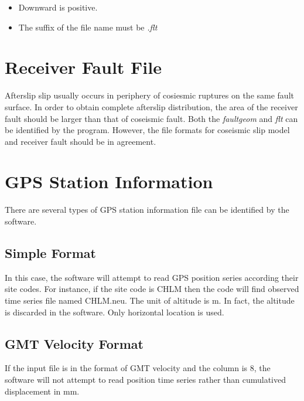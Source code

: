 \documentclass[UTF8,a4paper]{report}
\begin{document}
\begin{itemize}
\item Downward is positive.
\item The suffix of the file name must be \emph{.flt} 
\end{itemize}

\section{Receiver Fault File}
Afterslip slip usually occurs in periphery of cosiesmic ruptures on the same fault surface. In order to obtain complete afterslip distribution, the area of the receiver fault should be larger than that of coseismic fault. Both the \emph{faultgeom} and \emph{flt} can be identified by the program. However, the file formats for coseismic slip model and receiver fault should be in agreement.


\section{GPS Station Information}
There are several types of GPS station information file can be identified by the software.
\subsection{Simple Format}
\begin{center}
\end{center}
In this case, the software will attempt to read GPS position series according their site codes. For instance, if the site code is CHLM then the code will find observed time series file named CHLM.neu. The unit of altitude is m. In fact, the altitude is discarded in the software. Only horizontal location is used.

\subsection{GMT Velocity Format}

If the input file is in the format of GMT velocity and the column is 8, the software will not attempt to read position time series rather than cumulatived displacement in mm. 
\begin{center}
\end{center}
\end{document}
